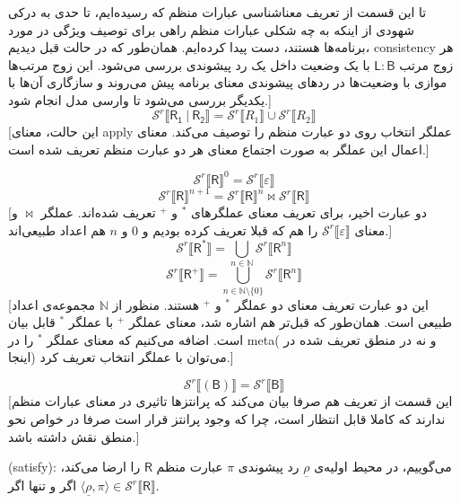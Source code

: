 \begin{defn}
تا این قسمت از تعریف معناشناسی عبارات منظم که رسیده‌ایم، تا حدی به درکی شهودی از اینکه به چه شکلی عبارات منظم راهی برای توصیف ویژگی‌ در مورد برنامه‌ها هستند، دست پیدا کرده‌ایم. همان‌طور که در حالت قبل دیدیم، \gls*{consistency} هر زوج مرتب
$\mathsf{L:B}$
با یک وضعیت داخل یک رد پیشوندی بررسی می‌‌شود. این زوج‌ مرتب‌ها موازی با وضعیت‌ها در ردهای پیشوندی معنای برنامه پیش می‌روند و سازگاری آن‌ها با یکدیگر بررسی می‌شود تا وارسی مدل انجام شود.]
$$\mathcal{S}^r \llbracket\mathsf{R_1\:|\:R_2}\rrbracket= 
\mathcal{S}^r \llbracket R_1\rrbracket \cup
\mathcal{S}^r \llbracket R_2\rrbracket$$
[این حالت، معنای \gls*{apply} عملگر انتخاب روی دو عبارت منظم را توصیف می‌کند. معنای اعمال این عملگر به صورت اجتماع معنای هر دو عبارت منظم تعریف شده است.]

$$\mathcal{S}^r \llbracket\mathsf{R}\rrbracket^0 = \mathcal{S}^r\llbracket\varepsilon\rrbracket$$
$$\mathcal{S}^r \llbracket\mathsf{R}\rrbracket^{n+1} = \mathcal{S}^r \llbracket\mathsf{R}\rrbracket^{n} \Join
\mathcal{S}^r \llbracket\mathsf{R}\rrbracket$$
[دو عبارت اخیر، برای تعریف معنای عملگرهای $^*$ و $^+$ تعریف شده‌اند. عملگر $\Join$ و معنای 
$\mathcal{S}^r\llbracket\varepsilon\rrbracket$
را هم که قبلا تعریف کرده بودیم و $0$ و $n$ هم اعداد طبیعی‌اند.]
$$\mathcal{S}^r\llbracket\mathsf{R^*}\rrbracket =  \bigcup_{n \in \mathbb{N}}
\mathcal{S}^r \llbracket\mathsf{R}^n\rrbracket$$
$$\mathcal{S}^r\llbracket\mathsf{R^+}\rrbracket =  \bigcup_{n \in \mathbb{N}\setminus\{0\}}
\mathcal{S}^r \llbracket\mathsf{R}^n\rrbracket$$
[این دو عبارت تعریف معنای دو عملگر $^*$ و $^+$ هستند. منظور از $\mathbb{N}$ مجموعه‌ی اعداد طبیعی است. همان‌طور که قبل‌تر هم اشاره شد، معنای عملگر $^+$ با عملگر $^*$ قابل بیان است. اضافه می‌کنیم که معنای عملگر $^*$ را در \gls*{meta}( و نه در منطق تعریف شده در اینجا) می‌توان با عملگر انتخاب تعریف کرد.]

$$\mathcal{S}^r \llbracket(\mathsf{B})\rrbracket=\mathcal{S}^r \llbracket\mathsf{B}\rrbracket$$
[این قسمت از تعریف هم صرفا بیان می‌کند که پرانتزها تاثیری در معنای عبارات منظم ندارند که کاملا قابل انتظار است، چرا که وجود پرانتز قرار است صرفا در خواص نحو منطق نقش داشته باشد.]

\end{defn}

\begin{defn}
	(\gls*{satisfy}): می‌گوییم، در محیط اولیه‌ی $\underline{\rho}$ رد پیشوندی $\pi$ عبارت منظم $\mathsf{R}$ را ارضا می‌کند، اگر و تنها اگر 
	$\langle \underline{\rho},\pi \rangle \in \mathcal{S}^r \llbracket \mathsf{R} \rrbracket$. 
\end{defn}

